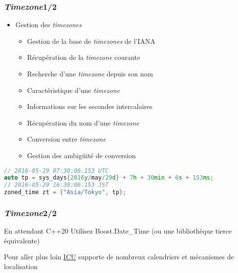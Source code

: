 \documentclass[C++.tex]{subfiles}
\begin{document}
\begin{frame}[fragile]
	\frametitle{\textit{Timezone}\titlehfill{}1/2}
	\begin{itemize}
		\item Gestion des \textit{timezones}
		\begin{itemize}
			\item Gestion de la base de \textit{timezones} de l'IANA


			\item Récupération de la \textit{timezone} courante
			\item Recherche d'une \textit{timezone} depuis son nom
			\item Caractéristique d'une \textit{timezone}
			\item Informations sur les secondes intercalaires
			\item Récupération du nom d'une \textit{timezone}
			\item Conversion entre \textit{timezone}
			\item Gestion des ambigüité de conversion
		\end{itemize}
	\end{itemize}

	\begin{lstlisting}[language=C++]
// 2016-05-29 07:30:06.153 UTC
auto tp = sys_days{2016y/may/29d} + 7h + 30min + 6s + 153ms; 
// 2016-05-29 16:30:06.153 JST
zoned_time zt = {"Asia/Tokyo", tp};\end{lstlisting}
\end{frame}

\begin{frame}[fragile]
	\frametitle{\textit{Timezone}\titlehfill{}2/2}
	\begin{block}{En attendant C++20}
		Utilisez Boost.Date\_Time (ou une bibliothèque tierce équivalente)
	\end{block}

	\begin{block}{Pour aller plus loin}
		\href{http://site.icu-project.org/home}{ICU} supporte de nombreux calendriers et mécanismes de localisation

	\end{block}
\end{frame}
\end{document}
